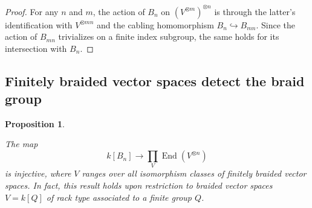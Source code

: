 \documentclass[12pt]{article}
\DeclareMathOperator{\End}{End}
\theoremstyle{plain}
\newtheorem{prop}[thm]{Proposition}
\theoremstyle{definition}
\theoremstyle{remark}
\begin{document}
\begin{proof}

For any $n$ and $m$, the action of $B_n$ on $(V^{\otimes m})^{\otimes n}$ is through the latter's identification with $V^{\otimes mn}$ and the cabling homomorphism $B_n \hookrightarrow B_{mn}$.  Since the action of $B_{mn}$ trivializes on a finite index subgroup, the same holds for its intersection with $B_n$.

\end{proof}

\subsection{Finitely braided vector spaces detect the braid group}

\begin{prop} \label{detect_prop}

The map 
%
$$k[B_n] \to \prod_V \End(V^{\otimes n})$$
%
is injective, where $V$ ranges over all isomorphism classes of finitely braided vector spaces.  In fact, this result holds upon restriction to braided vector spaces $V = k[Q]$ of rack type associated to a finite group $Q$.

\end{prop}
\end{document}
